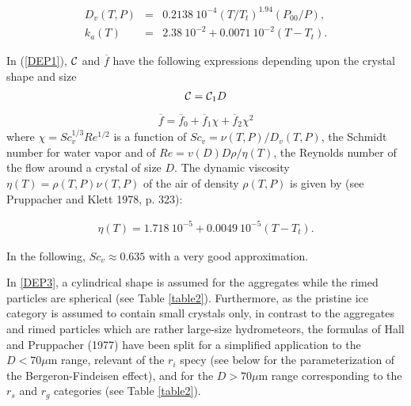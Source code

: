 \begin{eqnarray}
D_v(T,P)&=&0.2138\ 10^{-4}(T/T_t)^{1.94}(P_{00}/P), \\
k_a(T) &=& 2.38\ 10^{-2}+0.0071\ 10^{-2}(T-T_t).
\end{eqnarray}

\noindent In (\ref{DEP1}), $\cal C$ and $\overline{f}$ have the following
expressions depending upon the crystal shape and size
%
\begin{eqnarray}\label{DEP3}
  {\cal C}= {\cal C}_{1}D
\end{eqnarray}
\begin{eqnarray}\label{DEP4}
  \overline{f}=\overline{f}_{0}+\overline{f}_{1}{\chi}+\overline{f}_{2}{\chi}^2
\end{eqnarray}
%
\noindent where ${\chi}=Sc^{1/3}_{v}Re^{1/2}$ is a function of
$Sc_v=\nu(T,P)/D_{v}(T,P)$, the Schmidt number for water vapor and of
$Re=v(D)D\rho/\eta(T)$, the Reynolds number of the flow around a crystal of
size $D$. The dynamic viscosity $\eta(T)=\rho(T,P) \nu(T,P)$ of the air of
density $\rho(T,P)$ is given by (see Pruppacher and Klett 1978, p. 323):

\begin{eqnarray}
\eta(T)=1.718\ 10^{-5}+0.0049\ 10^{-5}(T-T_t).
\end{eqnarray}

\noindent In the following, $Sc_v\approx0.635$ with a very good approximation.

In \ref{DEP3}, a cylindrical shape is assumed for
the aggregates while the rimed particles are spherical (see Table \ref{table2}).
Furthermore, as the pristine ice category is assumed to contain small crystals
only, in contrast to the aggregates and rimed particles which are rather
large-size hydrometeors, the formulas of Hall and Pruppacher (1977) have been
split for a simplified application to the $D < 70 \mu$m range, relevant of the
$r_i$ specy (see below for the parameterization of the Bergeron-Findeisen
effect), and for the $D > 70 \mu$m range corresponding to the $r_s$ and
$r_g$ categories (see Table \ref{table2}).

